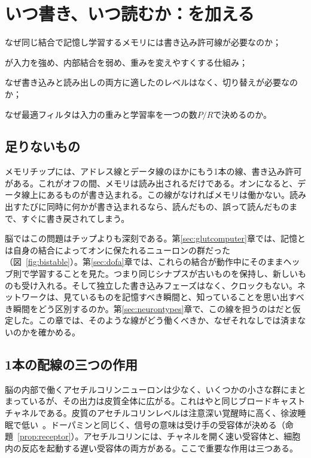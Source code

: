 \chapter{いつ書き、いつ読むか：を加える}
\label{sec:acet}
\begin{chaptergoals}
\item なぜ同じ結合で記憶し学習するメモリには書き込み許可線が必要なのか；
\item {}が入力を強め、内部結合を弱め、重みを変えやすくする仕組み；
\item なぜ書き込みと読み出しの両方に適したのレベルはなく、切り替えが必要なのか；
\item なぜ最適フィルタは入力の重みと学習率を一つの数$P/R$で決めるのか。
\end{chaptergoals}

\section{足りないもの}

メモリチップには、アドレス線とデータ線のほかにもう1本の線、書き込み許可がある。これがオフの間、メモリは読み出されるだけである。オンになると、データ線上にあるものが書き込まれる。この線がなければメモリは働かない。読み出すたびに同時に何かが書き込まれるなら、読んだもの、誤って読んだものまで、すぐに書き戻されてしまう。

脳ではこの問題はチップよりも深刻である。第\ref{sec:glutcomputer}章では、記憶とは自身の結合によってオンに保たれるニューロンの群だった（図~\ref{fig:bistable}）。第\ref{sec:dofa}章では、これらの結合が動作中にそのままヘッブ則で学習することを見た。つまり同じシナプスが古いものを保持し、新しいものも受け入れる。そして独立した書き込みフェーズはなく、クロックもない。ネットワークは、見ているものを記憶すべき瞬間と、知っていることを思い出すべき瞬間をどう区別するのか。第\ref{sec:neurontypes}章で、この線を担うのはだと仮定した。この章では、そのような線がどう働くべきか、なぜそれなしでは済まないのかを確かめる。

\section{1本の配線の三つの作用}

脳の内部で働くアセチルコリンニューロンは少なく、いくつかの小さな群にまとまっているが、その出力は皮質全体に広がる。これはやと同じブロードキャストチャネルである。皮質のアセチルコリンレベルは注意深い覚醒時に高く、徐波睡眠で低い~\cite{Hasselmo1999}。ドーパミンと同じく、信号の意味は受け手の受容体が決める（命題~\ref{prop:receptor}）。アセチルコリンには、チャネルを開く速い受容体と、細胞内の反応を起動する遅い受容体の両方がある。ここで重要な作用は三つある。

